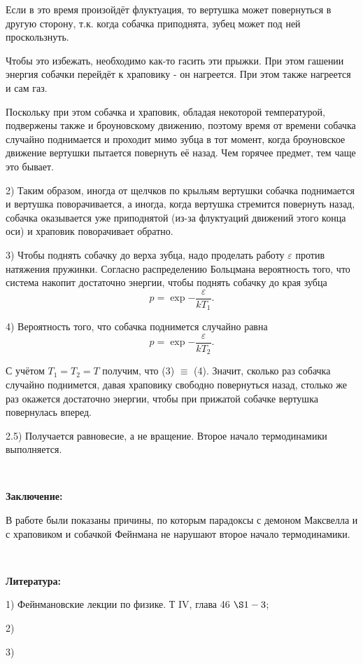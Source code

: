 \documentclass[a4paper, 12pt]{article}
\begin{document}
Если в это время произойдёт флуктуация, то вертушка может повернуться в другую сторону, т.к. когда собачка приподнята, зубец может под ней проскользнуть.

Чтобы это избежать, необходимо как-то гасить эти прыжки. При этом гашении энергия собачки перейдёт к храповику - он нагреется. При этом также нагреется и сам газ.

Поскольку при этом собачка и храповик, обладая некоторой температурой, подвержены также и броуновскому движению, поэтому время от времени собачка случайно поднимается и проходит мимо зубца в тот момент, когда броуновское движение вертушки пытается повернуть её назад. Чем горячее предмет, тем чаще это бывает.

2) Таким образом, иногда от щелчков по крыльям вертушки собачка поднимается и вертушка поворачивается, а иногда, когда вертушка стремится повернуть назад, собачка оказывается уже приподнятой (из-за флуктуаций движений этого конца оси) и храповик поворачивает обратно.

3) Чтобы поднять собачку до верха зубца, надо проделать работу $\varepsilon$ против натяжения пружинки. Согласно распределению Больцмана вероятность того, что система накопит достаточно энергии, чтобы поднять собачку до края зубца
\begin{equation}
p = \exp{-\frac{\varepsilon}{kT_1}}.
\label{eq:ref}
\end{equation}

4) Вероятность того, что собачка поднимется случайно равна
\begin{equation}
p = \exp{-\frac{\varepsilon}{kT_2}}.
\label{eq:ref}
\end{equation}

С учётом $T_1 = T_2 = T$ получим, что (3) $\equiv$ (4). Значит, сколько раз собачка случайно поднимется, давая храповику свободно повернуться назад, столько же раз окажется достаточно энергии, чтобы при прижатой собачке вертушка повернулась вперед.

2.5) Получается равновесие, а не вращение. Второе начало термодинамики выполняется.

\newline\

\textbf {Заключение:}

В работе были показаны причины, по которым парадоксы с демоном Максвелла и с храповиком и собачкой Фейнмана не нарушают второе начало термодинамики.

\newline\

\textbf{Литература:}

1) Фейнмановские лекции по физике. Т IV, глава 46 $\S 1-3$;

2) 

3) 
\end{document}
